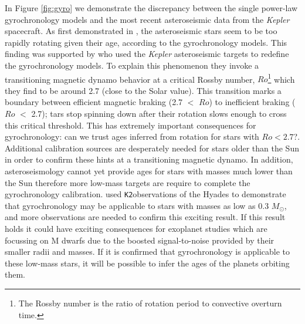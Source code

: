 \documentclass[12pt]{article}
\newcommand{\Kepler}{\textsl{Kepler}\xspace}
\newcommand{\ktwo}{{\tt K2}}
\begin{document}
In Figure \ref{fig:gyro} we demonstrate the discrepancy between the single
power-law gyrochronology models and the most recent asteroseismic data from
the \Kepler spacecraft.
As first demonstrated in \citet{angus2015}, the asteroseismic stars seem to be
too rapidly rotating given their age, according to the gyrochronology models.
This finding was supported by \citet{van-saders2016} who used the \Kepler
asteroseismic targets to redefine the gyrochronology models.
To explain this phenomenon they invoke a transitioning magnetic dynamo
behavior at a critical Rossby number, $Ro$\footnote{The Rossby number is the
ratio of rotation period to convective overturn time.} which they find to be
around 2.7 (close to the Solar value).
This transition marks a boundary between efficient magnetic braking (2.7 $<$
$Ro$) to inefficient braking ($Ro$ $<$ 2.7); tars stop spinning down after
their rotation slows enough to cross this critical threshold.
This has extremely important consequences for gyrochronology: can we trust
ages inferred from rotation for stars with $Ro < 2.7$?.
Additional calibration sources are desperately needed for stars older than the
Sun in order to confirm these hints at a transitioning magnetic dynamo.
In addition, asteroseismology cannot yet provide ages for stars with masses
much lower than the Sun therefore more low-mass targets are require to
complete the gyrochronology calibration.
\citet{douglas2017} used \ktwo observations of the Hyades to demonstrate that
gyrochronology may be applicable to stars with masses as low as 0.3 $M_\odot$,
and more observations are needed to confirm this exciting result.
If this result holds it could have exciting consequences for exoplanet studies
which are focussing on M dwarfs due to the boosted signal-to-noise provided by
their smaller radii and masses.
If it is confirmed that gyrochronology is applicable to these low-mass stars,
it will be possible to infer the ages of the planets orbiting them.


\end{document}
